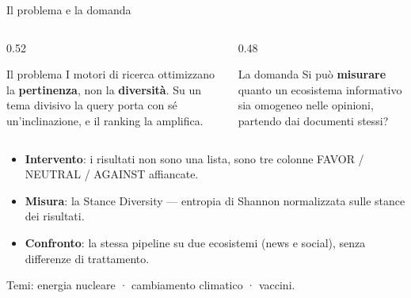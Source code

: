 \documentclass[aspectratio=169,11pt]{beamer}
\begin{document}
\begin{frame}{Il problema e la domanda}
  \begin{columns}[T]
    \begin{column}{0.52\textwidth}
      \begin{block}{Il problema}
        \small
        I motori di ricerca ottimizzano la \textbf{pertinenza}, non la
        \textbf{diversità}. Su un tema divisivo la query porta con sé
        un'inclinazione, e il ranking la amplifica.
      \end{block}
    \end{column}
    \begin{column}{0.48\textwidth}
      \begin{block}{La domanda}
        \small
        Si può \textbf{misurare} quanto un ecosistema informativo sia omogeneo
        nelle opinioni, partendo dai documenti stessi?
      \end{block}
    \end{column}
  \end{columns}
  \vspace{0.6em}
  \begin{itemize}\small
    \item \textbf{Intervento}: i risultati non sono una lista, sono \alert{tre colonne}
          FAVOR / NEUTRAL / AGAINST affiancate.
    \item \textbf{Misura}: la \alert{Stance Diversity} --- entropia di Shannon normalizzata
          sulle stance dei risultati.
    \item \textbf{Confronto}: la stessa pipeline su \alert{due ecosistemi} (news e social),
          senza differenze di trattamento.
  \end{itemize}
  \vspace{0.3em}
  {\footnotesize\color{echoslate} Temi: energia nucleare · cambiamento climatico · vaccini.}
\end{frame}
\end{document}

